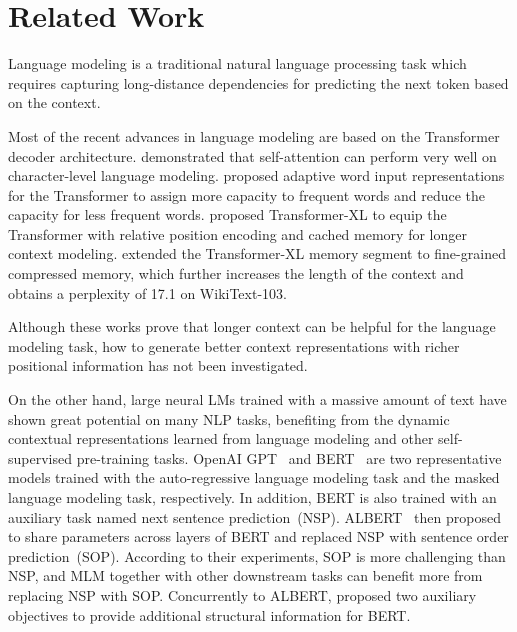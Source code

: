 \documentclass[letterpaper]{article}
\begin{document}
 \section{Related Work}
Language modeling is a traditional natural language processing task which requires capturing long-distance dependencies for predicting the next token based on the context. 

Most of the recent advances in language modeling are based on the Transformer~\cite{DBLP:conf/nips/VaswaniSPUJGKP17} decoder architecture.
\citet{DBLP:conf/aaai/Al-RfouCCGJ19} demonstrated that self-attention can perform very well on character-level language modeling. 
\citet{DBLP:conf/iclr/BaevskiA19} proposed adaptive word input representations for the Transformer to assign more capacity to frequent words and reduce the capacity for less frequent words. 
\citet{DBLP:conf/acl/DaiYYCLS19} proposed Transformer-XL to equip the Transformer with relative position encoding and cached memory for longer context modeling. 
\citet{DBLP:conf/iclr/RaePJHL20} extended the Transformer-XL memory segment to fine-grained compressed memory, which further increases the length of the context and obtains a perplexity of 17.1 on WikiText-103.

Although these works prove that longer context can be helpful for the language modeling task, how to generate better context representations with richer positional information has not been investigated.

On the other hand, large neural LMs trained with a massive amount of text have shown great potential on many NLP tasks, benefiting from the dynamic contextual representations learned from language modeling and other self-supervised pre-training tasks. 
OpenAI GPT~\cite{gpt} and BERT~\cite{DBLP:journals/corr/bert} are two representative models trained with the auto-regressive language modeling task and the masked language modeling task, respectively.
In addition, BERT is also trained with an auxiliary task named next sentence prediction~(NSP).
ALBERT~\cite{DBLP:conf/iclr/albert} then proposed to share parameters across layers of BERT and replaced NSP with sentence order prediction~(SOP). 
According to their experiments, SOP is more challenging than NSP, and MLM together with other downstream tasks can benefit more from replacing NSP with SOP. 
Concurrently to ALBERT, \citet{DBLP:journals/corr/structbert} proposed two auxiliary objectives to provide additional structural information for BERT.
\end{document}
